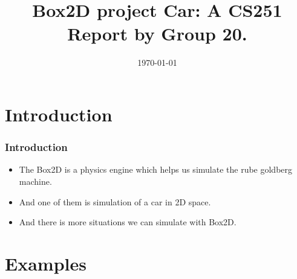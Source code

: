 \documentclass{beamer}
\author[Abhinav \& Surya \& Rishabh]
{%
   \texorpdfstring{
        \begin{columns}
            \column{.4\linewidth}
            \centering
            Abhinav\\
            {140050054}\\
            {abhinavrondi11296@gmail.com}
            \column{.4\linewidth}
            \centering
            Surya\\
            {140050055}\\
            {suri892010@gmail.com}
            \column{.33\linewidth}
            \centering
            Rishabh\\
            {140050061}\\
            {rishabh6417@gmail.com}
        \end{columns}
   }
   {John Doe \& Jane Doe}
}
\title{Box2D project Car: A CS251 Report by Group 20.}
\date{\today}
\begin{document}
\begin{frame}
\titlepage
\end{frame}
\section{Introduction}
\begin{frame}
\frametitle{Introduction}
\begin{itemize}
\item The Box2D is a physics engine which helps us simulate the rube goldberg machine.
\item And one of them is simulation of a car in 2D space.
\item And there is more situations we can simulate with Box2D.
\end{itemize}
\end{frame}
\section{Examples}
\end{document}
